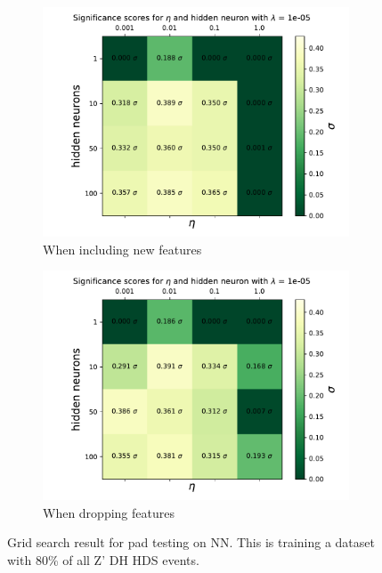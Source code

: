 \documentclass[12pt, a4paper]{book}
\begin{document}
\begin{figure}[!ht]
	\centering
	\begin{subfigure}[b]{0.49\textwidth}
      \centering
      \includegraphics[width=1\textwidth]{New_pad/GRID/Significance_ne.pdf}
      \caption{When including new features}
   \end{subfigure}
   \hfill
	\begin{subfigure}[b]{0.49\textwidth}
      \centering
      \includegraphics[width=1\textwidth]{No_pad/GRID/Significance_ne.pdf}
      \caption{When dropping features}
   \end{subfigure}
   \caption[Grid search result for pad testing on NN]{Grid search result for pad testing on NN.  This is training a dataset with 80\% of all Z' DH HDS events.}\label{fig:pad_griddy}
\end{figure}
\end{document}
